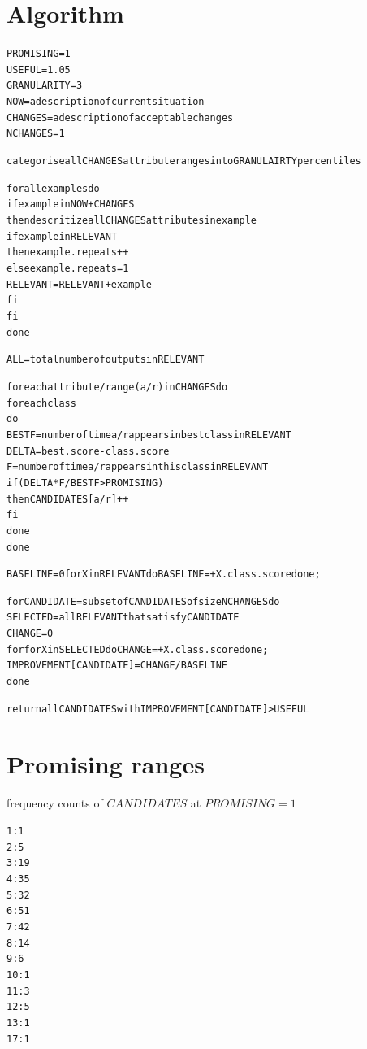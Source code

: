 \documentclass{article}
\begin{document}
\tableofcontents
\clearpage

\section{Algorithm}
{\footnotesize \begin{alltt}
PROMISING= 1
USEFUL= 1.05
GRANULARITY=3
NOW= a description of current situation
CHANGES= a description of acceptable changes
NCHANGES=1

categorise all CHANGES attribute ranges into GRANULAIRTY percentiles

for all examples do
    if example in NOW+CHANGES
    then descritize all CHANGES attributes in example
             if example in RELEVANT
             then example.repeats++
             else example.repeats=1
              RELEVANT=RELEVANT+example
             fi
        fi
done

ALL= total number of outputs in RELEVANT

for each attribute/range (a/r) in CHANGES do
    for each class
    do
        BESTF= number of time a/r appears in best class in RELEVANT
        DELTA= best.score - class.score
        F    = number of time a/r appears in this class in RELEVANT
        if (DELTA*F/BESTF > PROMISING)
             then CANDIDATES[a/r]++
        fi
    done
done

BASELINE=0 for X in RELEVANT do BASELINE=+ X.class.score  done;

for CANDIDATE=subset of CANDIDATES of size NCHANGES do
    SELECTED= all RELEVANT that satisfy CANDIDATE
    CHANGE=0
    for for X in SELECTED do CHANGE=+ X.class.score  done;
        IMPROVEMENT[CANDIDATE]=CHANGE/BASELINE
done

return all CANDIDATES with IMPROVEMENT[CANDIDATE] > USEFUL
\end{alltt}}

\clearpage
\section{Promising ranges}
frequency counts of $CANDIDATES$ at $PROMISING=1$

 {\footnotesize \begin{alltt}
   1 :    1
   2 :    5 ~
   3 :   19 ~~~~~
   4 :   35 ~~~~~~~~~
   5 :   32 ~~~~~~~~
   6 :   51 ~~~~~~~~~~~~~
   7 :   42 ~~~~~~~~~~~
   8 :   14 ~~~~
   9 :    6 ~~
  10 :    1
  11 :    3 ~
  12 :    5 ~
  13 :    1
  17 :    1
\end{alltt}}
\end{document}
